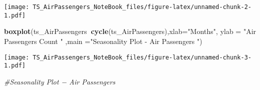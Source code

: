 \documentclass[]{article}
\newenvironment{Shaded}{\begin{snugshade}}{\end{snugshade}}
\newcommand{\CommentTok}[1]{\textcolor[rgb]{0.56,0.35,0.01}{\textit{#1}}}
\newcommand{\DataTypeTok}[1]{\textcolor[rgb]{0.13,0.29,0.53}{#1}}
\newcommand{\KeywordTok}[1]{\textcolor[rgb]{0.13,0.29,0.53}{\textbf{#1}}}
\newcommand{\NormalTok}[1]{#1}
\newcommand{\OperatorTok}[1]{\textcolor[rgb]{0.81,0.36,0.00}{\textbf{#1}}}
\newcommand{\StringTok}[1]{\textcolor[rgb]{0.31,0.60,0.02}{#1}}
\begin{document}
\texttt{[image: TS\_AirPassengers\_NoteBook\_files/figure-latex/unnamed-chunk-2-1.pdf]}

\begin{Shaded}
\begin{Highlighting}[]
\KeywordTok{boxplot}\NormalTok{(ts_AirPassengers}\OperatorTok{~}\KeywordTok{cycle}\NormalTok{(ts_AirPassengers),}\DataTypeTok{xlab=}\StringTok{"Months"}\NormalTok{, }\DataTypeTok{ylab =} \StringTok{"Air Passengers Count "}\NormalTok{ ,}\DataTypeTok{main =}\StringTok{"Seasonality Plot - Air Passengers "}\NormalTok{)}
\end{Highlighting}
\end{Shaded}

\texttt{[image: TS\_AirPassengers\_NoteBook\_files/figure-latex/unnamed-chunk-3-1.pdf]}

\begin{Shaded}
\begin{Highlighting}[]
\CommentTok{#Seasonality Plot − Air Passengers}
\end{Highlighting}
\end{Shaded}
\end{document}
